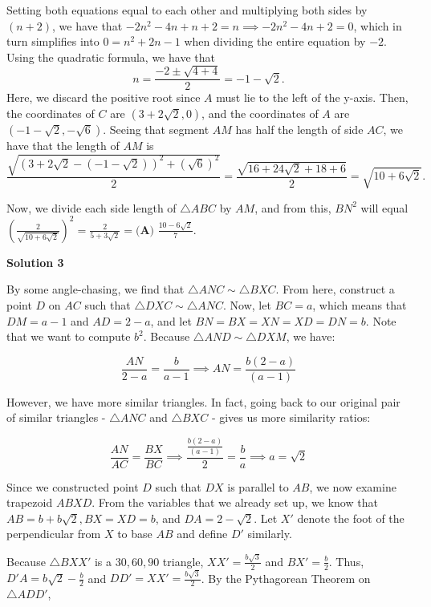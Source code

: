 \begin{enumerate}
 Setting both equations equal to each other and multiplying both sides by $(n + 2)$, we have that $-2n^2 - 4n + n + 2 = n \implies -2n^2 - 4n + 2 = 0$, which in turn simplifies into $0 = n^2 + 2n - 1$ when dividing the entire equation by $-2.$ Using the quadratic formula, we have that 
 \[n = \frac{-2 \pm \sqrt{4 + 4}}{2} = -1 - \sqrt{2}.\] Here, we discard the positive root since $A$ must lie to the left of the y-axis. Then, the coordinates of $C$ are $(3 + 2\sqrt{2}, 0)$, and the coordinates of $A$ are $(-1 - \sqrt{2}, -\sqrt{6}).$ Seeing that segment $AM$ has half the length of side $AC$, we have that the length of $AM$ is 
 \[\frac{\sqrt{(3 + 2\sqrt{2} - (-1 - \sqrt{2}))^2 + (\sqrt{6})^2}}{2} = \frac{\sqrt{16 + 24\sqrt{2} + 18 + 6}}{2} = \sqrt{10 + 6\sqrt{2}}.\]

 Now, we divide each side length of $\triangle ABC$ by $AM$, and from this, $BN^2$ will equal $\left(\frac{2}{\sqrt{10 + 6\sqrt{2}}}\right)^2 = \frac{2}{5+3\sqrt{2}} = \boxed{\textbf{(A) }\frac{10-6\sqrt{2}}{7}.}$




\textbf{Solution 3}

By some angle-chasing, we find that $\triangle ANC \sim \triangle BXC$. From here, construct a point $D$ on $AC$ such that $\triangle DXC \sim \triangle ANC$. Now, let $BC = a$, which means that $DM = a - 1$ and $AD = 2 - a$, and let $BN = BX = XN = XD = DN = b$. Note that we want to compute $b^2$. Because $\triangle AND \sim \triangle DXM$, we have:

 
 \[\frac{AN}{2-a} = \frac{b}{a-1} \implies AN = \frac{b(2-a)}{(a-1)}\]

 However, we have more similar triangles. In fact, going back to our original pair of similar triangles - $\triangle ANC$ and $\triangle BXC$ - gives us more similarity ratios:

 
 \[\frac{AN}{AC} = \frac{BX}{BC} \implies \frac{\frac{b(2-a)}{(a-1)}}{2} = \frac{b}{a} \implies a = \sqrt{2}\]

 Since we constructed point $D$ such that $DX$ is parallel to $AB$, we now examine trapezoid $ABXD$. From the variables that we already set up, we know that $AB = b + b\sqrt{2}, BX = XD = b$, and $DA = 2 - \sqrt{2}$. Let $X'$ denote the foot of the perpendicular from $X$ to base $AB$ and define $D'$ similarly. 

 Because $\triangle BXX'$ is a $30, 60, 90$ triangle, $XX' = \frac{b\sqrt{3}}{2}$ and $BX' = \frac{b}{2}$. Thus, $D'A = b\sqrt{2} - \frac{b}{2}$ and $DD' = XX' = \frac{b\sqrt{3}}{2}$. By the Pythagorean Theorem on $\triangle ADD'$,


\end{enumerate}

